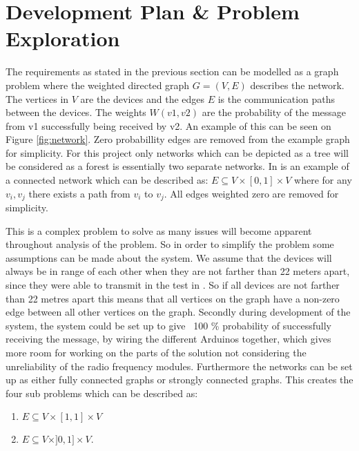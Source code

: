 \section{Development Plan \& Problem Exploration}

\noindent The requirements as stated in the previous section can be modelled as a graph problem where the weighted directed graph $G = (V, E)$ describes the network. 
The vertices in $V$ are the devices and the edges $E$ is the communication paths between the devices. 
The weights $W(v1, v2)$ are the probability of the message from v1 successfully being received by v2.
An example of this can be seen on Figure \ref{fig:network}.
Zero probabillity edges are removed from the example graph for simplicity. 
For this project only networks which can be depicted as a tree will be considered as a forest is essentially two separate networks.
In  is an example of a connected network which can be described as: $E \subseteq V \times [0,1] \times V$ where for any $v_i, v_j$ there exists a path from $v_i$ to $v_j$.
All edges weighted zero are removed for simplicity.


\noindent This is a complex problem to solve as many issues will become apparent throughout analysis of the problem.
So in order to simplify the problem some assumptions can be made about the system.
We assume that the devices will always be in range of each other when they are not farther than 22 meters apart, since they were able to transmit in the test in  .
So if all devices are not farther than 22 metres apart this means that all vertices on the graph have a non-zero edge between all other vertices on the graph.
Secondly during development of the system, the system could be set up to give ~100 \% probability of successfully receiving the message, by wiring the different Arduinos together, which gives more room for working on the parts of the solution not considering the unreliability of the radio frequency modules.
Furthermore the networks can be set up as either fully connected graphs or strongly connected graphs.
This creates the four sub problems which can be described as:  %

\begin{enumerate}
    \item $E \subseteq V \times [1,1] \times V$
    \item $E \subseteq V \times ]0,1] \times V$. 
\end{enumerate}

